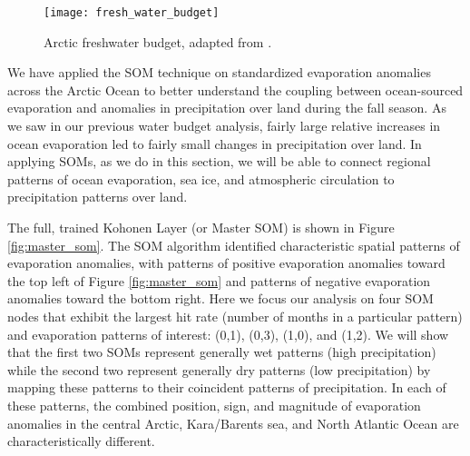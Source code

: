 \begin{figure}
  \centering
  \texttt{[image: fresh\_water\_budget]}
  \caption{Arctic freshwater budget, adapted from \citet{Serreze_2006a}.}
  \label{fig:fwb}
\end{figure}


We have applied the SOM technique on standardized evaporation anomalies across the Arctic Ocean to better understand the coupling between ocean-sourced evaporation and anomalies in precipitation over land during the fall season.
As we saw in our previous water budget analysis, fairly large relative increases in ocean evaporation led to fairly small changes in precipitation over land.
In applying SOMs, as we do in this section, we will be able to connect regional patterns of ocean evaporation, sea ice, and atmospheric circulation to precipitation patterns over land.

The full, trained Kohonen Layer (or Master SOM) is shown in Figure \ref{fig:master_som}.
The SOM algorithm identified characteristic spatial patterns of evaporation anomalies, with patterns of positive evaporation anomalies toward the top left of Figure \ref{fig:master_som} and patterns of negative evaporation anomalies toward the bottom right.
Here we focus our analysis on four SOM nodes that exhibit the largest hit rate (number of months in a particular pattern) and evaporation patterns of interest: (0,1), (0,3), (1,0), and (1,2).
We will show that the first two SOMs represent generally wet patterns (high precipitation) while the second two represent generally dry patterns (low precipitation) by mapping these patterns to their coincident patterns of precipitation.
In each of these patterns, the combined position, sign, and magnitude of evaporation anomalies in the central Arctic, Kara/Barents sea, and North Atlantic Ocean are characteristically different.

